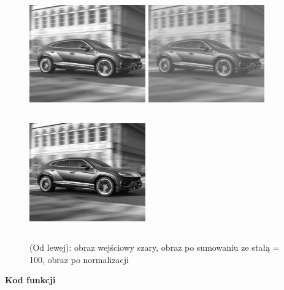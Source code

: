 \documentclass[magisterska,openany]{pracadypl}
\begin{document}
\begin{figure}[h]
\centering
\includegraphics[width=5cm, height=5cm]{orgi/gLU.jpg}
\includegraphics[width=5cm, height=5cm]{3_1/add_constG2.jpg}
\includegraphics[width=5cm, height=5cm]{3_1/nadd_constG2.jpg}
\caption{(Od lewej): obraz wejściowy szary, obraz po sumowaniu ze stałą = 100, obraz po normalizacji}
\end{figure}

\newpage
\textbf{\Large Kod funkcji}
   
\end{document}
